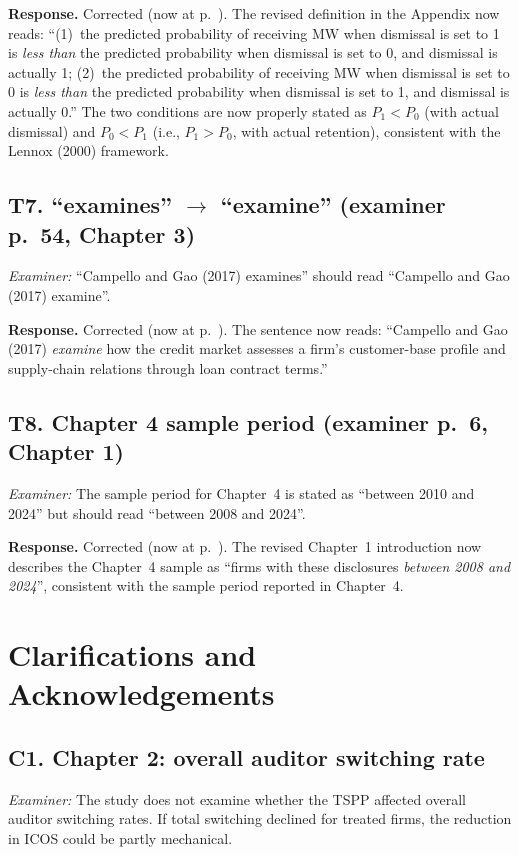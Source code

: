 \documentclass[11pt,a4paper]{article}
\newcommand{\nowat}[1]{(now at p.~\pageref{#1})}
\begin{document}
\noindent\textbf{Response.} Corrected \nowat{viva:c2-icosdef}. The revised definition in the Appendix now reads: ``(1)~the predicted probability of receiving MW when dismissal is set to 1 is \emph{less than} the predicted probability when dismissal is set to 0, and dismissal is actually 1; (2)~the predicted probability of receiving MW when dismissal is set to 0 is \emph{less than} the predicted probability when dismissal is set to 1, and dismissal is actually 0.'' The two conditions are now properly stated as $P_1 < P_0$ (with actual dismissal) and $P_0 < P_1$ (i.e., $P_1 > P_0$, with actual retention), consistent with the Lennox (2000) framework.

\subsection*{T7. ``examines'' $\rightarrow$ ``examine'' (examiner p.~54, Chapter 3)}
\textit{Examiner:} ``Campello and Gao (2017) examines'' should read ``Campello and Gao (2017) examine''.

\noindent\textbf{Response.} Corrected \nowat{viva:c3-campello}. The sentence now reads: ``Campello and Gao (2017) \emph{examine} how the credit market assesses a firm's customer-base profile and supply-chain relations through loan contract terms.''

\subsection*{T8. Chapter 4 sample period (examiner p.~6, Chapter 1)}
\textit{Examiner:} The sample period for Chapter~4 is stated as ``between 2010 and 2024'' but should read ``between 2008 and 2024''.

\noindent\textbf{Response.} Corrected \nowat{viva:c1-sample}. The revised Chapter~1 introduction now describes the Chapter~4 sample as ``firms with these disclosures \emph{between 2008 and 2024}'', consistent with the sample period reported in Chapter~4.

\section{Clarifications and Acknowledgements}

\subsection*{C1. Chapter 2: overall auditor switching rate}
\textit{Examiner:} The study does not examine whether the TSPP affected overall auditor switching rates. If total switching declined for treated firms, the reduction in ICOS could be partly mechanical.
\end{document}
